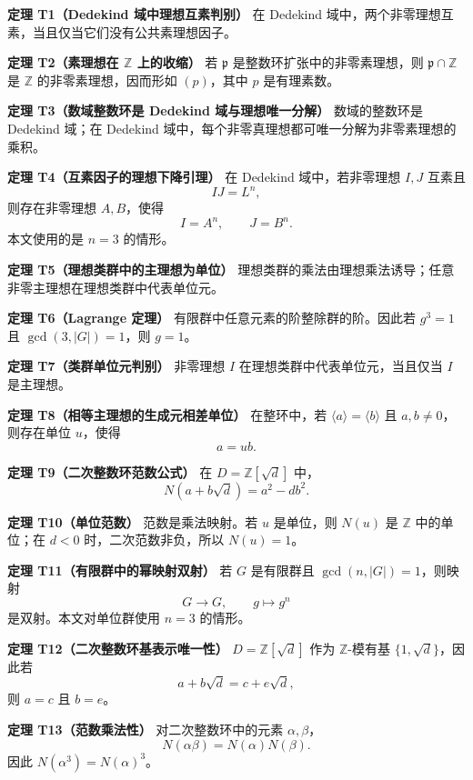 \textbf{定理 T1（Dedekind 域中理想互素判别）}
在 Dedekind 域中，两个非零理想互素，当且仅当它们没有公共素理想因子。

\textbf{定理 T2（素理想在 \(\mathbb Z\) 上的收缩）}
若 \(\mathfrak p\) 是整数环扩张中的非零素理想，则 \(\mathfrak p\cap\mathbb Z\) 是 \(\mathbb Z\) 的非零素理想，因而形如 \((p)\)，其中 \(p\) 是有理素数。

\textbf{定理 T3（数域整数环是 Dedekind 域与理想唯一分解）}
数域的整数环是 Dedekind 域；在 Dedekind 域中，每个非零真理想都可唯一分解为非零素理想的乘积。

\textbf{定理 T4（互素因子的理想下降引理）}
在 Dedekind 域中，若非零理想 \(I,J\) 互素且
\[
    IJ=L^n,
\]
则存在非零理想 \(A,B\)，使得
\[
    I=A^n,\qquad J=B^n.
\]
本文使用的是 \(n=3\) 的情形。

\textbf{定理 T5（理想类群中的主理想为单位）}
理想类群的乘法由理想乘法诱导；任意非零主理想在理想类群中代表单位元。

\textbf{定理 T6（Lagrange 定理）}
有限群中任意元素的阶整除群的阶。因此若 \(g^3=1\) 且 \(\gcd(3,|G|)=1\)，则 \(g=1\)。

\textbf{定理 T7（类群单位元判别）}
非零理想 \(I\) 在理想类群中代表单位元，当且仅当 \(I\) 是主理想。

\textbf{定理 T8（相等主理想的生成元相差单位）}
在整环中，若 \(\langle a\rangle=\langle b\rangle\) 且 \(a,b\ne0\)，则存在单位 \(u\)，使得
\[
    a=ub.
\]

\textbf{定理 T9（二次整数环范数公式）}
在 \(D=\mathbb Z[\sqrt d]\) 中，
\[
    N(a+b\sqrt d)=a^2-db^2.
\]

\textbf{定理 T10（单位范数）}
范数是乘法映射。若 \(u\) 是单位，则 \(N(u)\) 是 \(\mathbb Z\) 中的单位；在 \(d<0\) 时，二次范数非负，所以 \(N(u)=1\)。

\textbf{定理 T11（有限群中的幂映射双射）}
若 \(G\) 是有限群且 \(\gcd(n,|G|)=1\)，则映射
\[
    G\to G,\qquad g\mapsto g^n
\]
是双射。本文对单位群使用 \(n=3\) 的情形。

\textbf{定理 T12（二次整数环基表示唯一性）}
\(D=\mathbb Z[\sqrt d]\) 作为 \(\mathbb Z\)-模有基 \(\{1,\sqrt d\}\)，因此若
\[
    a+b\sqrt d=c+e\sqrt d,
\]
则 \(a=c\) 且 \(b=e\)。

\textbf{定理 T13（范数乘法性）}
对二次整数环中的元素 \(\alpha,\beta\)，
\[
    N(\alpha\beta)=N(\alpha)N(\beta).
\]
因此 \(N(\alpha^3)=N(\alpha)^3\)。
\par\endgroup

